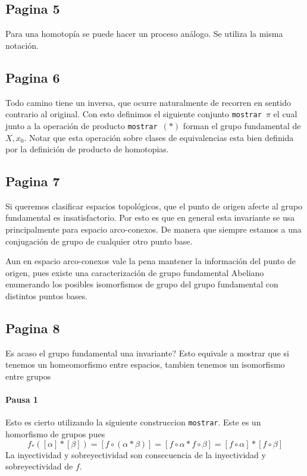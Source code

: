 \documentclass[letterpaper]{article}
\begin{document}
\subsection*{Pagina 5}
Para una homotopía se puede hacer un proceso análogo. Se utiliza la
misma notación.

\subsection*{Pagina 6}
Todo camino tiene un inversa, que ocurre naturalmente de recorren en
sentido contrario al original. Con esto definimos el siguiente conjunto
\texttt{mostrar \(\pi\)} el cual junto a la operación de producto
\texttt{mostrar \((*)\)} forman el grupo fundamental de \(X,x_0\). Notar
que esta operación sobre clases de equivalencias esta bien definida por
la definición de producto de homotopias.

\subsection*{Pagina 7}
Si queremos clasificar espacios topológicos, que el punto de origen
afecte al grupo fundamental es insatisfactorio. Por esto es que en
general esta invariante se usa principalmente para espacio arco-conexos.
De manera que siempre estamos a una conjugación de grupo de cualquier
otro punto base.

Aun en espacio arco-conexos vale la pena mantener la información del
punto de origen, pues existe una caracterización de grupo fundamental
Abeliano enumerando los posibles isomorfismos de grupo del grupo
fundamental con distintos puntos bases.

\subsection*{Pagina 8}
Es acaso el grupo fundamental una invariante? Esto equivale a mostrar
que si tenemos un homeomorfismo entre espacios, tambien tenemos un
isomorfismo entre grupos

\paragraph{Pausa 1}
Esto es cierto utilizando la siguiente construccion \texttt{mostrar}.
Este es un homorfismo de grupos pues
\[ f_* ([\alpha] * [\beta]) = [f \circ (\alpha * \beta) ] = [f \circ
  \alpha * f \circ \beta] = [f \circ \alpha ] * [f \circ \beta]\]
La inyectividad y sobreyectividad son consecuencia de la inyectividad y
sobreyectividad de \(f\).
\end{document}
